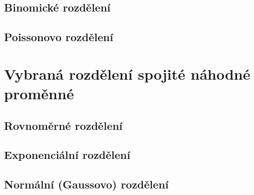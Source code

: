 \subsection{Binomické rozdělení}


\subsection{Poissonovo rozdělení}



\section{Vybraná rozdělení spojité náhodné proměnné}

\subsection{Rovnoměrné rozdělení}


\subsection{Exponenciální rozdělení}


\subsection{Normální (Gaussovo) rozdělení}

